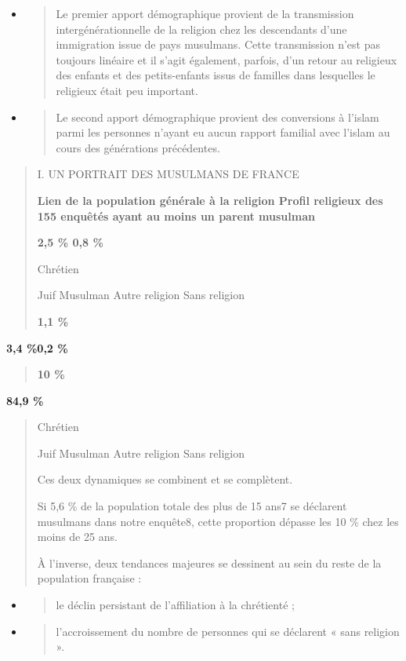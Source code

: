 \begin{itemize}
\item
  \begin{quote}
  Le premier apport démographique provient de la transmission
  intergénérationnelle de la religion chez les descendants d'une
  immigration issue de pays musulmans. Cette transmission n'est pas
  toujours linéaire et il s'agit également, parfois, d'un retour au
  religieux des enfants et des petits-enfants issus de familles dans
  lesquelles le religieux était peu important.
  \end{quote}
\item
  \begin{quote}
  Le second apport démographique provient des conversions à l'islam
  parmi les personnes n'ayant eu aucun rapport familial avec l'islam au
  cours des générations précédentes.
  \end{quote}
\end{itemize}

\begin{quote}
I. UN PORTRAIT DES MUSULMANS DE FRANCE

\textbf{Lien de la population générale à la religion Profil religieux
des 155 enquêtés ayant au moins un parent musulman}

\textbf{2,5 \% 0,8 \%}

Chrétien

Juif Musulman Autre religion Sans religion

\textbf{1,1 \%}
\end{quote}

\textbf{3,4 \%0,2 \%}

\begin{quote}
\textbf{10 \%}
\end{quote}

\textbf{84,9 \%}

\begin{quote}
Chrétien

Juif Musulman Autre religion Sans religion

Ces deux dynamiques se combinent et se complètent.

Si 5,6 \% de la population totale des plus de 15 ans7 se déclarent
musulmans dans notre enquête8, cette proportion dépasse les 10 \% chez
les moins de 25 ans.

À l'inverse, deux tendances majeures se dessinent au sein du reste de la
population française :
\end{quote}

\begin{itemize}
\item
  \begin{quote}
  le déclin persistant de l'affiliation à la chrétienté ;
  \end{quote}
\item
  \begin{quote}
  l'accroissement du nombre de personnes qui se déclarent « sans
  religion ».
  \end{quote}
\end{itemize}

